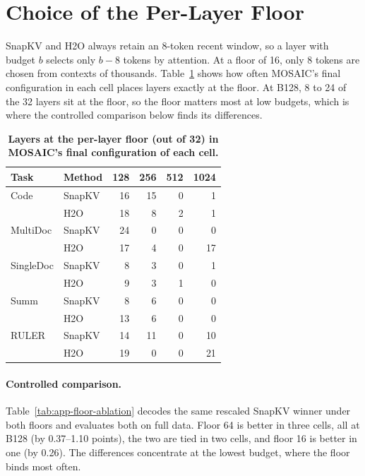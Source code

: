 \section{Choice of the Per-Layer Floor}
\label{app:floor}

SnapKV and H2O always retain an 8-token recent window, so a layer with budget $b$ selects only $b-8$ tokens by attention. At a floor of 16, only 8 tokens are chosen from contexts of thousands. Table~\ref{tab:app-floor} shows how often MOSAIC's final configuration in each cell places layers exactly at the floor. At B128, 8 to 24 of the 32 layers sit at the floor, so the floor matters most at low budgets, which is where the controlled comparison below finds its differences.

\begin{table}[t]
  \centering
  \footnotesize
  \setlength{\tabcolsep}{4pt}
  \begin{tabular}{@{}l l rrrr@{}}
    \toprule
    Task & Method & 128 & 256 & 512 & 1024 \\
    \midrule
    Code & SnapKV & 16 & 15 & 0 & 1 \\
     & H2O & 18 & 8 & 2 & 1 \\
    MultiDoc & SnapKV & 24 & 0 & 0 & 0 \\
     & H2O & 17 & 4 & 0 & 17 \\
    SingleDoc & SnapKV & 8 & 3 & 0 & 1 \\
     & H2O & 9 & 3 & 1 & 0 \\
    Summ & SnapKV & 8 & 6 & 0 & 0 \\
     & H2O & 13 & 6 & 0 & 0 \\
    RULER & SnapKV & 14 & 11 & 0 & 10 \\
     & H2O & 19 & 0 & 0 & 21 \\
    \bottomrule
  \end{tabular}
  \caption{\textbf{Layers at the per-layer floor (out of 32) in MOSAIC's final configuration of each cell.}}
  \label{tab:app-floor}
\end{table}


\paragraph{Controlled comparison.} Table~\ref{tab:app-floor-ablation} decodes the same rescaled SnapKV winner under both floors and evaluates both on full data. Floor 64 is better in three cells, all at B128 (by 0.37--1.10 points), the two are tied in two cells, and floor 16 is better in one (by 0.26). The differences concentrate at the lowest budget, where the floor binds most often.

